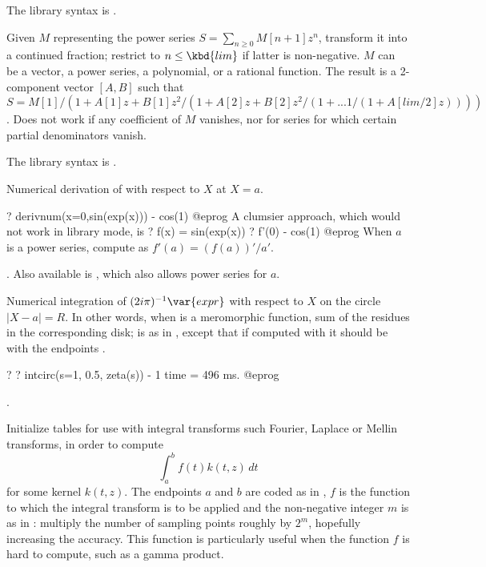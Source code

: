 The library syntax is .

\label{se:contfracinit}
Given $M$ representing the power series $S=\sum_{n\ge0} M[n+1]z^n$,
transform it into a continued fraction; restrict to $n\leq \kbd{lim}$
if latter is non-negative. $M$ can be a vector, a power
series, a polynomial, or a rational function.
The result is a 2-component vector $[A,B]$ such that
$S = M[1] / (1+A[1]z+B[1]z^2/(1+A[2]z+B[2]z^2/(1+...1/(1+A[lim/2]z))))$.
Does not work if any coefficient of $M$ vanishes, nor for series for
which certain partial denominators vanish.

The library syntax is .

\label{se:derivnum}
Numerical derivation of  with respect to $X$ at $X=a$.

\bprog
? derivnum(x=0,sin(exp(x))) - cos(1)
@eprog
A clumsier approach, which would not work in library mode, is
\bprog
? f(x) = sin(exp(x))
? f'(0) - cos(1)
@eprog
When $a$ is a power series, compute  as $f'(a) =
(f(a))'/a'$.

. Also
available is , which also allows power series for $a$.

\label{se:intcirc}
Numerical
integration of $(2i\pi)^{-1}\var{expr}$ with respect to $X$ on the circle
$|X-a| = R$.
In other words, when  is a meromorphic
function, sum of the residues in the corresponding disk;  is as in
, except that if computed with  it should be with
the endpoints \kbd{[-1, 1]}.

\bprog
? 
? intcirc(s=1, 0.5, zeta(s)) - 1
time = 496 ms.
@eprog

.

\label{se:intfuncinit}
Initialize tables for use with integral transforms such Fourier,
Laplace or Mellin transforms, in order to compute
$$ \int_a^b f(t) k(t,z) \, dt $$
for some kernel $k(t,z)$.
The endpoints $a$ and $b$ are coded as in , $f$ is the
function to which the integral transform is to be applied and the
non-negative integer $m$ is as in : multiply the number of
sampling points roughly by $2^m$, hopefully increasing the accuracy. This
function is particularly useful when the function $f$ is hard to compute,
such as a gamma product.

